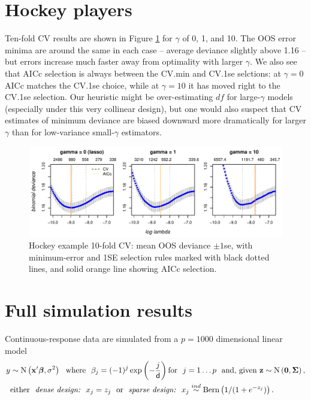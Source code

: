 \documentclass[12pt]{article}
\newcommand{\bs}[1]{\boldsymbol{#1}}
\newcommand{\mr}[1]{\mathrm{#1}}
\newcommand{\bm}[1]{\mathbf{#1}}
\begin{document}
\section{Hockey players}

Ten-fold CV results are shown in Figure
\ref{nhlcv} for $\gamma$ of 0, 1, and 10.  The OOS error minima are around the
same in each case -- average deviance slightly above 1.16 -- but errors
increase much faster away from optimality with larger $\gamma$.   We also see
that AICc selection is always between the CV.min and CV.1se selctions:  at
$\gamma=0$ AICc matches the CV.1se choice, while at $\gamma=10$ it has moved
right to the CV.1se  selection.  Our heuristic might be
over-estimating $df$ for large-$\gamma$ models (especially under this very
collinear design), but one would also suspect that CV estimates of minimum
deviance are biased downward more dramatically for larger $\gamma$ than for
low-variance small-$\gamma$ estimators.


\begin{figure}[h!]
\includegraphics[width=\textwidth]{graphs/nhl_cv}
\caption{\label{nhlcv} Hockey example 10-fold CV: mean OOS deviance $\pm 1$se, with minimum-error and 1SE selection rules marked with black dotted lines, and solid orange line showing AICc selection. }
\end{figure}


\section{Full simulation results}

Continuous-response data are simulated from
 a $p=1000$ dimensional linear model
\begin{align}
\label{simdgp-both}
y &\sim \mr{N}\left(\bm{x}'\bs{\beta},\sigma^2\right) ~~\text{where}~~
\beta_j = (-1)^j\exp\left(-\frac{j}{{\sf d}} \right)\text{for}~~j=1\dots p~~\text{and,~given~}\bm{z} \sim \mr{N}\left(\bm{0},\bs{\Sigma}\right)\notag,\\
&\text{either}~~\textit{dense design:~~} x_j=z_j ~~\text{or}~~ \textit{sparse design:~~} 
x_j \stackrel{ind}{\sim} \mr{Bern}\left( 1/(1+e^{-z_j})\right).
\end{align}
\end{document}
